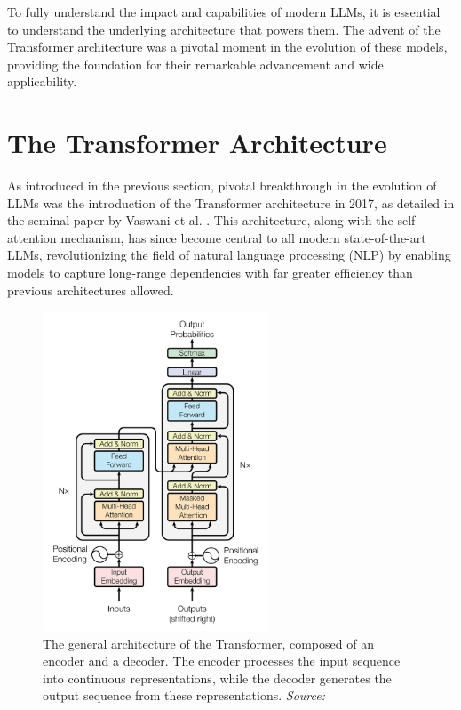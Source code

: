 To fully understand the impact and capabilities of modern LLMs, it is essential to understand the underlying architecture that powers them. The advent of the Transformer architecture was a pivotal moment in the evolution of these models, providing the foundation for their remarkable advancement and wide applicability.

\section{The Transformer Architecture}

As introduced in the previous section, pivotal breakthrough in the evolution of LLMs was the introduction of the Transformer architecture in 2017, as detailed in the seminal paper by Vaswani et al. \cite{vaswani2017attention}. This architecture, along with the self-attention mechanism, has since become central to all modern state-of-the-art LLMs, revolutionizing the field of natural language processing (NLP) by enabling models to capture long-range dependencies with far greater efficiency than previous architectures allowed.

\begin{figure}[h!]
    \centering
    \includegraphics[width=0.6\textwidth]{images/llms/transformer-architecture.png}
    \caption{The general architecture of the Transformer, composed of an encoder and a decoder. The encoder processes the input sequence into continuous representations, while the decoder generates the output sequence from these representations. \textit{Source:} \cite{vaswani2017attention}}
    \label{fig:transformer-architecture}
\end{figure}

